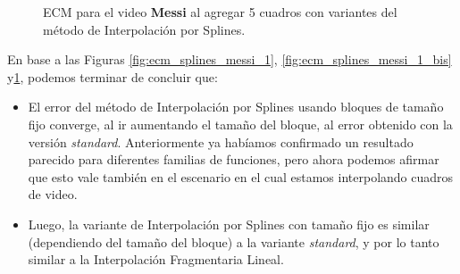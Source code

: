 \begin{figure}[H]
	\centering
	\caption{ECM para el video \textbf{Messi} al agregar 5 cuadros con variantes del método de Interpolación por Splines.}
	\label{fig:ecm_splines_messi_5}
\end{figure}

En base a las Figuras \ref{fig:ecm_splines_messi_1}, \ref{fig:ecm_splines_messi_1_bis} y\ref{fig:ecm_splines_messi_5}, podemos terminar de concluir que:

\begin{itemize}
    \item El error del método de Interpolación por Splines usando bloques de tamaño fijo converge, al
        ir aumentando el tamaño del bloque, al error obtenido con la versión \textit{standard}.
        Anteriormente ya habíamos confirmado un resultado parecido para diferentes familias de funciones,
        pero ahora podemos afirmar que esto vale también en el escenario en el cual estamos interpolando
        cuadros de video.
    \item Luego, la variante de Interpolación por Splines con tamaño fijo es
        similar (dependiendo del tamaño del bloque) a la variante \textit{standard}, y por lo tanto
        similar a la Interpolación Fragmentaria Lineal.
\end{itemize}


